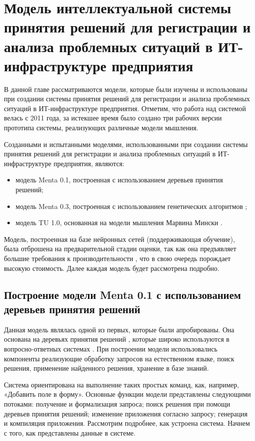 \chapter{Модель интеллектуальной системы принятия решений для регистрации и анализа проблемных ситуаций в ИТ-инфраструктуре предприятия} \label{chapt3}

В данной главе рассматриваются модели, которые были изучены и использованы при создании системы принятия решений для регистрации и анализа проблемных ситуаций в ИТ-инфраструктуре предприятия. Отметим, что работа над системой велась с 2011 года, за истекшее время было создано три рабочих версии прототипа системы, реализующих различные модели мышления. \par
Созданными и испытанными моделями, использованными при создании системы принятия решений для регистрации и анализа проблемных ситуаций в ИТ-инфраструктуре предприятия, являются:
 \begin{itemize}
	\item модель Menta 0.1, построенная с использованием деревьев принятия решений;
	\item модель Menta 0.3, построенная с использованием генетических алгоритмов \cite{ArtificialIntelligence} ;
	\item модель TU 1.0, основанная на модели мышления Марвина Мински  \cite{EmotionMachine}.
\end{itemize}

Модель, построенная на базе нейронных сетей (поддерживающая обучение), была отброшена на предварительной стадии оценки, так как она предъявляет большие требования к производительности \cite{NEURAL}, что в свою очередь порождает высокую стоимость. Далее каждая модель будет рассмотрена подробно.


\section{Построение модели Menta 0.1 с использованием деревьев принятия решений} \label{sect3_1}
Данная модель являлась одной из первых, которые были апробированы. Она основана на деревьях принятия решений \cite{DTREE}, которые широко используются в вопросно-ответных системах \cite{DC1, DC2, DC3}. При построении модели использовались компоненты реализующие обработку запросов на естественном языке, поиск решения, применение найденного решения, хранение в базе знаний.\par
Система ориентирована на выполнение таких простых команд, как, например, «Добавить поле в форму». Основные функции модели представлены следующими потоками: получение и формализация запроса; поиск решения при помощи деревьев принятия решений; изменение приложения согласно запросу; генерация и компиляция приложения. Рассмотрим подробнее, как устроена система. Начнем с того, как представлены данные в системе.

